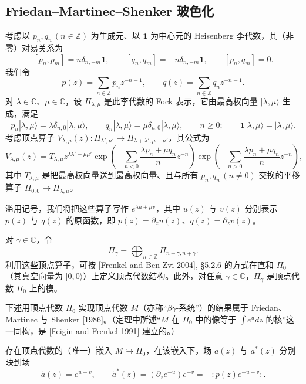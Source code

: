 \subsection{Friedan--Martinec--Shenker 玻色化}

考虑以 $p_n,q_n\,(n\in\mathbb{Z})$ 为生成元、以 $\mathbf{1}$ 为中心元的 Heisenberg 李代数，其（非零）对易关系为
\[
    [p_n,p_m]=n\delta_{n,-m}\mathbf{1},\qquad
    [q_n,q_m]=-n\delta_{n,-m}\mathbf{1},\qquad
    [p_n,q_m]=0.
\]
我们令
\[
    p(z)=\sum_{n\in\mathbb{Z}}p_nz^{-n-1},\qquad
    q(z)=\sum_{n\in\mathbb{Z}}q_nz^{-n-1}.
\]
对 $\lambda\in\mathbb{C}$、$\mu\in\mathbb{C}$，设 $\Pi_{\lambda,\mu}$ 是此李代数的 Fock 表示，它由最高权向量 $|\lambda,\mu\rangle$ 生成，满足
\[
    p_n|\lambda,\mu\rangle=\lambda\delta_{n,0}|\lambda,\mu\rangle,\qquad
    q_n|\lambda,\mu\rangle=\mu\delta_{n,0}|\lambda,\mu\rangle,\qquad n\ge0;\qquad
    \mathbf{1}|\lambda,\mu\rangle=|\lambda,\mu\rangle.
\]
考虑顶点算子 $V_{\lambda,\mu}(z):\Pi_{\lambda',\mu'}\to\Pi_{\lambda+\lambda',\mu+\mu'}$，其公式为
\[
    V_{\lambda,\mu}(z)=T_{\lambda,\mu}z^{\lambda\lambda'-\mu\mu'}
    \exp\left(-\sum_{n<0}\frac{\lambda p_n+\mu q_n}{n}z^{-n}\right)
    \exp\left(-\sum_{n>0}\frac{\lambda p_n+\mu q_n}{n}z^{-n}\right),
\]
其中 $T_{\lambda,\mu}$ 是把最高权向量送到最高权向量、且与所有 $p_n,q_n\,(n\ne0)$ 交换的平移算子 $\Pi_{0,0}\to\Pi_{\lambda,\mu}$。

滥用记号，我们将把这些算子写作 $e^{\lambda u+\mu v}$，其中 $u(z)$ 与 $v(z)$ 分别表示 $p(z)$ 与 $q(z)$ 的原函数，即 $p(z)=\partial_zu(z)$、$q(z)=\partial_zv(z)$。

对 $\gamma\in\mathbb{C}$，令
\[
    \Pi_\gamma=\bigoplus_{n\in\mathbb{Z}}\Pi_{n+\gamma,n+\gamma}.
\]
利用这些顶点算子，可按 [Frenkel and Ben-Zvi 2004], §5.2.6 的方式在直和 $\Pi_0$（其真空向量为 $|0,0\rangle$）上定义顶点代数结构。此外，对任意 $\gamma\in\mathbb{C}$，$\Pi_\gamma$ 是顶点代数 $\Pi_0$ 上的模。

下述用顶点代数 $\Pi_0$ 实现顶点代数 $M$（亦称“$\beta\gamma$-系统”）的结果属于 Friedan、Martinec 与 Shenker [1986]。（定理中所述“$M$ 在 $\Pi_0$ 中的像等于 $\int e^udz$ 的核”这一同构，是 [Feigin and Frenkel 1991] 建立的。）

\begin{theorem}
    存在顶点代数的（唯一）嵌入 $M\hookrightarrow\Pi_0$，在该嵌入下，场 $a(z)$ 与 $a^*(z)$ 分别映到场
    \[
        \widetilde{a}(z)=e^{u+v},\qquad
        \widetilde{a}^*(z)=(\partial_ze^{-u})e^{-v}=-:p(z)e^{-u-v}:.
    \]
\end{theorem}


